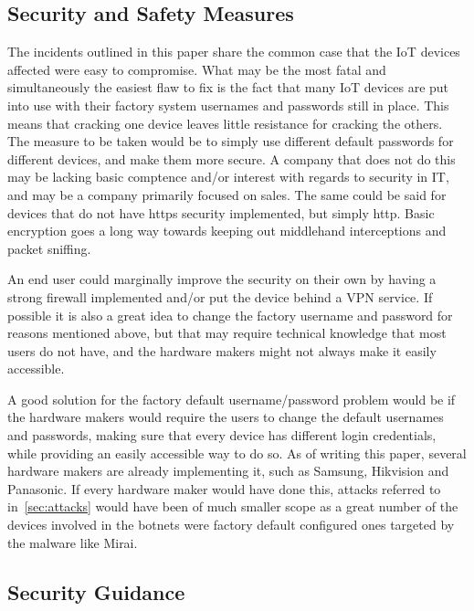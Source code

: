 \documentclass[a4paper, conference]{IEEEtran/IEEEtran}
\begin{document}
\subsection{Security and Safety Measures}
The incidents outlined in this paper share the common case that the IoT devices affected were easy to compromise. What may be the most fatal and simultaneously the easiest flaw to fix is the fact that many IoT devices are put into use with their factory system usernames and passwords still in place. This means that cracking one device leaves little resistance for cracking the others. The measure to be taken would be to simply use different default passwords for different devices, and make them more secure. A company that does not do this may be lacking basic comptence and/or interest with regards to security in IT, and may be a company primarily focused on sales. The same could be said for devices that do not have https security implemented, but simply http. Basic encryption goes a long way towards keeping out middlehand interceptions and packet sniffing.

An end user could marginally improve the security on their own by having a strong firewall implemented and/or put the device behind a VPN service. If possible it is also a great idea to change the factory username and password for reasons mentioned above, but that may require technical knowledge that most users do not have, and the hardware makers might not always make it easily accessible. 

A good solution for the factory default username/password problem would be if the hardware makers would require the users to change the default usernames and passwords, making sure that every device has different login credentials, while providing an easily accessible way to do so. As of writing this paper, several hardware makers are already implementing it, such as Samsung, Hikvision and Panasonic.\cite{ipvm} If every hardware maker would have done this, attacks referred to in~\ref{sec:attacks} would have been of much smaller scope as a great number of the devices involved in the botnets were factory default configured ones targeted by the malware like Mirai.


\subsection{Security Guidance}
\end{document}
